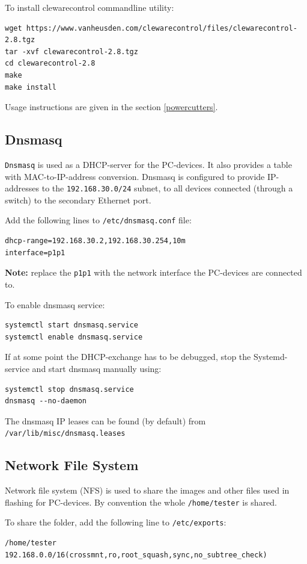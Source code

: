 \documentclass[a4paper,11pt]{article}
\newcommand{\note}{\textbf{Note: }}
\newcommand{\cmd}[1]{\texttt{#1}}
\begin{document}
To install clewarecontrol commandline utility:
\begin{lstlisting}
wget https://www.vanheusden.com/clewarecontrol/files/clewarecontrol-2.8.tgz
tar -xvf clewarecontrol-2.8.tgz
cd clewarecontrol-2.8
make
make install
\end{lstlisting}

Usage instructions are given in the section \ref{powercutters}.

\subsection*{Dnsmasq}
\cmd{Dnsmasq} is used as a DHCP-server for the PC-devices. It also provides a table with MAC-to-IP-address conversion. Dnsmasq is configured to provide IP-addresses to the \cmd{192.168.30.0/24} subnet, to all devices connected (through a switch) to the secondary Ethernet port.

Add the following lines to \cmd{/etc/dnsmasq.conf} file:
\begin{lstlisting}
dhcp-range=192.168.30.2,192.168.30.254,10m
interface=p1p1
\end{lstlisting}
\note{replace the \cmd{p1p1} with the network interface the PC-devices are connected to.}

To enable dnsmasq service:
\begin{lstlisting}
systemctl start dnsmasq.service
systemctl enable dnsmasq.service
\end{lstlisting}
If at some point the DHCP-exchange has to be debugged, stop the Systemd-service and start dnsmasq manually using:
\begin{lstlisting}
systemctl stop dnsmasq.service
dnsmasq --no-daemon
\end{lstlisting}

The dnsmasq IP leases can be found (by default) from \cmd{/var/lib/misc/dnsmasq.leases}

\subsection*{Network File System}
Network file system (NFS) is used to share the images and other files used in flashing for PC-devices. By convention the whole \cmd{/home/tester} is shared.

To share the folder, add the following line to \cmd{/etc/exports}:
\begin{lstlisting}
/home/tester 192.168.0.0/16(crossmnt,ro,root_squash,sync,no_subtree_check)
\end{lstlisting}
\end{document}
